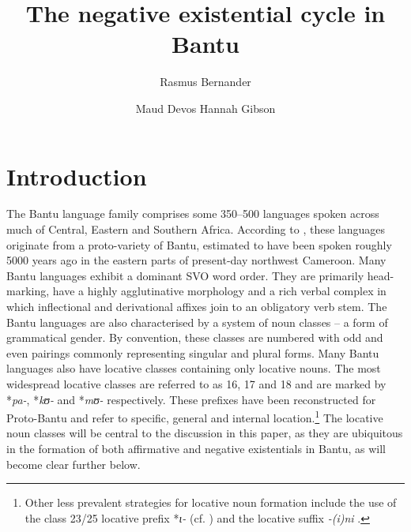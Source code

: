 \documentclass[output=paper]{langsci/langscibook}
\title{The negative existential cycle in Bantu}
\author{%
Rasmus Bernander\affiliation{University of Helsinki}\and
Maud Devos\affiliation{Ghent University}\lastand 
Hannah Gibson\affiliation{University of Essex}%
}
\begin{document}
\section{Introduction}\label{sec:1:1} The Bantu language family
comprises some 350--500 languages spoken across much of Central, Eastern
and Southern Africa. According to \citet{Grollemund2015}, these languages
originate from a proto-variety of Bantu, estimated to have been spoken
roughly 5000 years ago in the eastern parts of present-day northwest
Cameroon. Many Bantu languages exhibit a dominant SVO word order. They are
primarily head-marking, have a highly agglutinative morphology and a rich
verbal complex in which inflectional and derivational affixes join to an
obligatory verb stem. The Bantu languages are also characterised by a
system of noun classes -- a form of grammatical gender. By convention,
these classes are numbered with odd and even pairings commonly representing
singular and plural forms. Many Bantu languages also have locative classes
containing only  locative nouns. The most widespread locative classes are
referred to as 16, 17 and 18 and are marked by *{\it pa-}, *{\it kʊ-} and
*{\it mʊ-} respectively. These prefixes have been reconstructed for
Proto-Bantu and refer to
specific, general and internal location.\footnote{Other less prevalent
strategies for locative noun formation include the use of the class 23/25
locative prefix *{\it ɩ-} (cf.
\citealt{Gregoire1975,Maho1999}) and
the locative suffix {\it -(i)ni} \citep{SamsonSchadeberg1994}.} The locative noun classes will be central
to the discussion in this paper, as they are ubiquitous in the formation of
both affirmative and negative existentials in Bantu, as will become clear
further below.
\end{document}
